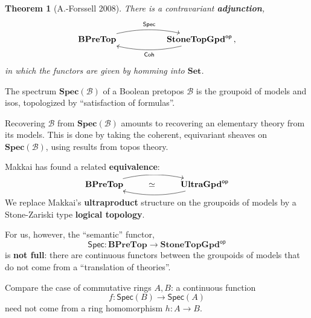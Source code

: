 \documentclass[11pt]{article}
\newtheorem{theorem}{Theorem}
\theoremstyle{remark}
\theoremstyle{definition}
\newcommand{\myemph}[1]{\textbf{#1}}
\begin{document}


\begin{theorem}[A.-Forssell 2008]
There is a contravariant \myemph{adjunction},
\[
\xymatrix{ 
\mathbf{BPreTop}  \ar@/{}^{1pc}/[rr]^{\mathsf{Spec}}     &&  \mathbf{StoneTopGpd}^{\mathsf{op}}  \ar@/{}^{1pc}/[ll]^{\mathsf{Coh}} \,,
} 
\]
in which the functors are given by homming into $\mathbf{Set}$.
\end{theorem}

The spectrum $\mathbf{Spec}(\mathcal{B})$ of a Boolean pretopos $\mathcal{B}$ is the groupoid of models and isos, topologized by ``satisfaction of formulas''.
\medskip

Recovering $\mathcal{B}$ from $\mathbf{Spec}(\mathcal{B})$ amounts to recovering an elementary theory from its models.  This is done by taking the coherent, equivariant sheaves on $\mathbf{Spec}(\mathcal{B})$, using results from topos theory.


Makkai has found a related \myemph{equivalence}:
\[
\xymatrix{ 
\mathbf{BPreTop}  \ar@/{}^{1pc}/[rr]     & \simeq &  \mathbf{UltraGpd}^{\mathsf{op}}  \ar@/{}^{1pc}/[ll] \\
} 
\]
We replace Makkai's \myemph{ultraproduct} structure on the groupoids of models by a Stone-Zariski type \myemph{logical topology}.
\medskip

For us, however, the ``semantic'' functor,
\[
\mathsf{Spec} : \mathbf{BPreTop} \longrightarrow \mathbf{StoneTopGpd}^{\mathsf{op}}
\]
 is \myemph{not full}: there are continuous functors between the groupoids of models that do not come from a ``translation of theories''.
\medskip

Compare the case of commutative rings $A, B$:  a continuous function $$f : \mathsf{Spec}(B) \to \mathsf{Spec}(A)$$ need not come from a ring homomorphism $h : A\to B$. 
\end{document}
